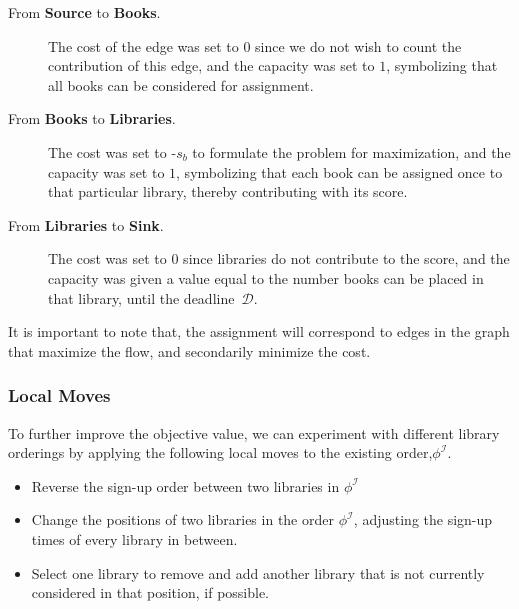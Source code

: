 \begin{description}
  \item[From \textbf{Source} to \textbf{Books}.] The cost of the edge was set
    to $0$ since we do not wish to count the contribution of this edge, and the capacity
    was set to $1$, symbolizing that all books can be considered for assignment.

  \item[From \textbf{Books} to \textbf{Libraries}.] The cost was set to -$s_{b}$ to
    formulate the problem for maximization, and the capacity was set to $1$, symbolizing
    that each book can be assigned once to that particular library, thereby
    contributing with its score.

  \item[From \textbf{Libraries} to \textbf{Sink}.] The cost was set to $0$
    since libraries do not contribute to the score, and the capacity was given a value
    equal to the number books can be placed in that library, until the deadline~$\mathcal{D}$.
\end{description}

It is important to note that, the assignment will correspond to edges in the
graph that maximize the flow, and secondarily minimize the cost.

\subsubsection*{Local Moves}

To further improve the objective value, we can experiment with different library
orderings by applying the following local moves to the existing order,$\phi^\mathcal{I}$.

\begin{itemize}
  \item Reverse the sign-up order between two libraries in $\phi^\mathcal{I}$
  \item Change the positions of two libraries in the order $\phi^\mathcal{I}$,
        adjusting the sign-up times of every library in between.
  \item Select one library to remove and add another library that is not
        currently considered in that position, if possible.
\end{itemize}